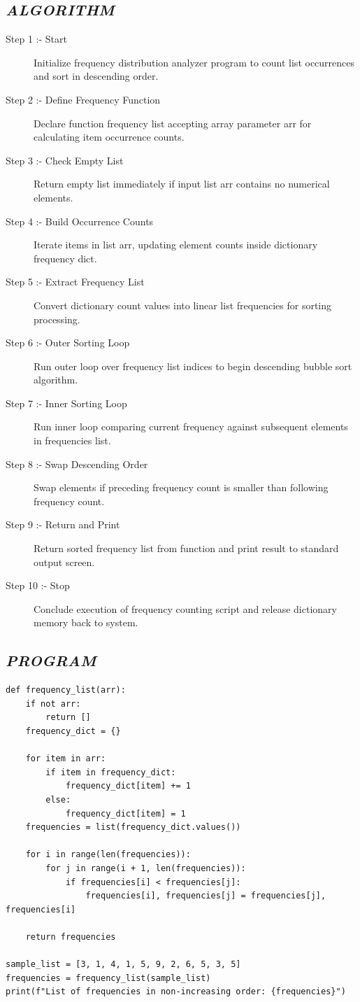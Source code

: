 \documentclass[11pt,a4paper]{article}
\begin{document}
\subsection*{\textit{ALGORITHM}}
\begin{description}
  \item[Step 1 :- Start] Initialize frequency distribution analyzer program to count list occurrences and sort in descending order.
  \item[Step 2 :- Define Frequency Function] Declare function frequency list accepting array parameter arr for calculating item occurrence counts.
  \item[Step 3 :- Check Empty List] Return empty list immediately if input list arr contains no numerical elements.
  \item[Step 4 :- Build Occurrence Counts] Iterate items in list arr, updating element counts inside dictionary frequency dict.
  \item[Step 5 :- Extract Frequency List] Convert dictionary count values into linear list frequencies for sorting processing.
  \item[Step 6 :- Outer Sorting Loop] Run outer loop over frequency list indices to begin descending bubble sort algorithm.
  \item[Step 7 :- Inner Sorting Loop] Run inner loop comparing current frequency against subsequent elements in frequencies list.
  \item[Step 8 :- Swap Descending Order] Swap elements if preceding frequency count is smaller than following frequency count.
  \item[Step 9 :- Return and Print] Return sorted frequency list from function and print result to standard output screen.
  \item[Step 10 :- Stop] Conclude execution of frequency counting script and release dictionary memory back to system.
\end{description}

\subsection*{\textit{PROGRAM}}
\begin{lstlisting}[style=pythonstyle]
def frequency_list(arr): 
    if not arr:  
        return [] 
    frequency_dict = {} 
 
    for item in arr: 
        if item in frequency_dict: 
            frequency_dict[item] += 1 
        else: 
            frequency_dict[item] = 1 
    frequencies = list(frequency_dict.values()) 
 
    for i in range(len(frequencies)): 
        for j in range(i + 1, len(frequencies)): 
            if frequencies[i] < frequencies[j]: 
                frequencies[i], frequencies[j] = frequencies[j], frequencies[i] 
 
    return frequencies 

sample_list = [3, 1, 4, 1, 5, 9, 2, 6, 5, 3, 5] 
frequencies = frequency_list(sample_list) 
print(f"List of frequencies in non-increasing order: {frequencies}")
\end{lstlisting}
\end{document}
